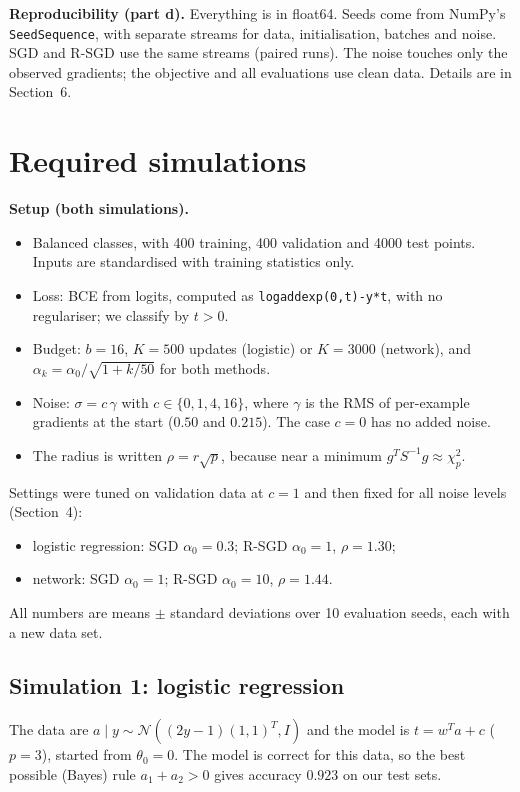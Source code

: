 \documentclass[11pt,a4paper]{article}
\begin{document}
\textbf{Reproducibility (part d).} Everything is in float64. Seeds come from NumPy's
\texttt{SeedSequence}, with separate streams for data, initialisation, batches and noise.
SGD and R-SGD use the same streams (paired runs). The noise touches only the observed gradients; the
objective and all evaluations use clean data. Details are in Section~6.

\section{Required simulations}

\textbf{Setup (both simulations).}
\begin{itemize}
\item Balanced classes, with 400 training, 400 validation and 4000 test points. Inputs are standardised
with training statistics only.
\item Loss: BCE from logits, computed as \texttt{logaddexp(0,t)-y*t}, with no regulariser; we classify
by $t>0$.
\item Budget: $b=16$, $K=500$ updates (logistic) or $K=3000$ (network), and
$\alpha_k=\alpha_0/\sqrt{1+k/50}$ for both methods.
\item Noise: $\sigma=c\,\gamma$ with $c\in\{0,1,4,16\}$, where $\gamma$ is the RMS of per-example
gradients at the start ($0.50$ and $0.215$). The case $c=0$ has no added noise.
\item The radius is written $\rho=r\sqrt p$, because near a minimum $g^TS^{-1}g\approx\chi^2_p$.
\end{itemize}

Settings were tuned on validation data at $c=1$ and then fixed for all noise levels (Section~4):
\begin{itemize}
\item logistic regression: SGD $\alpha_0=0.3$; R-SGD $\alpha_0=1$, $\rho=1.30$;
\item network: SGD $\alpha_0=1$; R-SGD $\alpha_0=10$, $\rho=1.44$.
\end{itemize}
All numbers are means $\pm$ standard deviations over 10 evaluation seeds, each with a new data set.

\subsection{Simulation 1: logistic regression}

The data are $a\mid y\sim\mathcal N((2y-1)(1,1)^T,I)$ and the model is $t=w^Ta+c$ ($p=3$), started from
$\theta_0=0$. The model is correct for this data, so the best possible (Bayes) rule $a_1+a_2>0$ gives
accuracy $0.923$ on our test sets.
\end{document}

